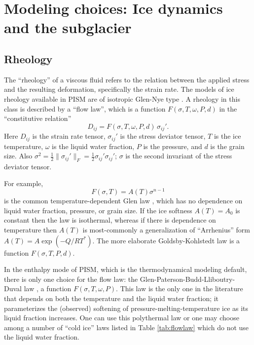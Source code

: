 
\section{Modeling choices:  Ice dynamics and the subglacier}
\label{sec:modeling-dynamics}

\subsection{Rheology}
\label{sec:rheology}

The ``rheology'' of a viscous fluid refers to the relation between the applied stress and the resulting deformation, specifically the strain rate.  The models of ice rheology available in PISM are of isotropic Glen-Nye type \cite{Paterson}.   A rheology in this class is described by a ``flow law'', which is a function $F(\sigma,T,\omega,P,d)$ in the ``constitutive relation''
\begin{equation}
D_{ij} = F(\sigma,T,\omega,P,d)\, \sigma_{ij}'.  \label{eq:constitutive}
\end{equation}
Here $D_{ij}$ is the strain rate tensor, $\sigma_{ij}'$ is the stress deviator tensor, $T$ is the ice temperature, $\omega$ is the liquid water fraction, $P$ is the pressure, and $d$ is the grain size.  Also $\sigma^2 = \frac{1}{2} \|\sigma_{ij}'\|_F = \frac{1}{2} \sigma_{ij}' \sigma_{ij}'$; $\sigma$ is the second invariant of the stress deviator tensor.

For example,
\begin{equation}
F(\sigma,T) = A(T) \sigma^{n-1}  \label{eq:isothermalglen}
\end{equation}
is the common temperature-dependent Glen law \cite{PatersonBudd,BBL}, which has no dependence on liquid water fraction, pressure, or grain size.  If the ice softness $A(T)=A_0$ is constant then the law is isothermal, whereas if there is dependence on temperature then $A(T)$ is most-commonly a generalization of ``Arrhenius'' form $A(T) = A \exp(-Q/RT^*)$.  The more elaborate Goldsby-Kohlstedt law \cite{GoldsbyKohlstedt} is a function $F(\sigma,T,P,d)$.

In the enthalpy mode of PISM, which is the thermodynamical modeling default, there is only one choice for the flow law: the Glen-Paterson-Budd-Lliboutry-Duval law \cite{AschwandenBuelerKhroulevBlatter,LliboutryDuval1985,PatersonBudd}, a function $F(\sigma,T,\omega,P)$.  This law is the only one in the literature that depends on both the temperature and the liquid water fraction; it parameterizes the (observed) softening of pressure-melting-temperature ice as its liquid fraction increases.  One can use this polythermal law or one may choose among a number of ``cold ice'' laws listed in Table \ref{tab:flowlaw} which do not use the liquid water fraction.  

